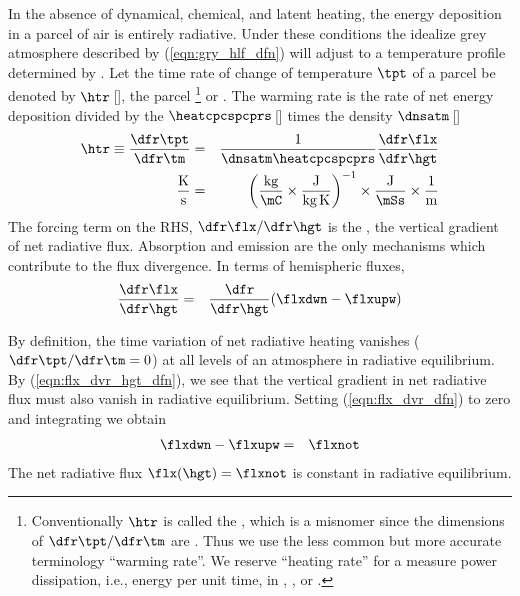 \documentclass[12pt]{article}
\begin{document}
In the absence of dynamical, chemical, and latent heating, the energy
deposition in a parcel of air is entirely radiative.
Under these conditions the idealize grey atmosphere described by
(\ref{eqn:gry_hlf_dfn}) will adjust to a temperature profile
determined by .
Let the time rate of change of temperature $\tpt$ of a parcel be
denoted by $\htr$\,[\kxs], the parcel \footnote{%
Conventionally $\htr$ is called the , which is a
misnomer since the dimensions of $\dfr\tpt/\dfr\tm$ are \kxs.
Thus we use the less common but more accurate terminology ``warming rate''.
We reserve ``heating rate'' for a measure power dissipation, i.e.,
energy per unit time, in \jxs, \jxmCs, or \jxkgs.} or . 
The warming rate is the rate of net energy deposition divided by the
$\heatcpcspcprs$\,[\jxkgK] times the density $\dnsatm$\,[\kgxmC]
\begin{eqnarray}
\htr \equiv \frac{\dfr\tpt}{\dfr\tm} & = & 
\frac{1}{\dnsatm \heatcpcspcprs} \frac{\dfr\flx}{\dfr\hgt} \\
\frac{\mbox{K}}{\mbox{s}} & = & 
\left( \frac{\mbox{kg}}{\mbox{\mC}} \times \frac{\mbox{J}}{\mbox{kg\,K}} \right)^{-1} 
\times \frac{\mbox{J}}{\mbox{\mSs}} \times \frac{1}{\mbox{m}} \nonumber
\label{eqn:flx_dvr_hgt_dfn}
\end{eqnarray}
The forcing term on the RHS, $\dfr\flx/\dfr\hgt$ is the 
, the vertical gradient of 
net radiative flux.
Absorption and emission are the only mechanisms which contribute to
the flux divergence.
In terms of hemispheric fluxes,
\begin{eqnarray}
\frac{\dfr\flx}{\dfr\hgt} & = & \frac{\dfr}{\dfr\hgt} (\flxdwn - \flxupw)
\label{eqn:flx_dvr_dfn}
\end{eqnarray}

By definition, the time variation of net radiative heating vanishes 
($\dfr\tpt/\dfr\tm = 0$) at all levels of an atmosphere in radiative
equilibrium. 
By (\ref{eqn:flx_dvr_hgt_dfn}), we see that the vertical gradient in 
net radiative flux must also vanish in radiative equilibrium.
Setting (\ref{eqn:flx_dvr_dfn}) to zero and integrating we obtain
\begin{eqnarray}
\flxdwn - \flxupw & = & \flxnot
\label{eqn:flx_dvr_cst}
\end{eqnarray}
The net radiative flux $\flx(\hgt) = \flxnot$ is constant in 
radiative equilibrium.
\end{document}
